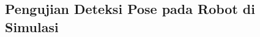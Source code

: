 \subsection{Pengujian Deteksi Pose pada Robot di Simulasi}
\label{subsec:deteksiposesimulasi}

\textcolor{red}{\lipsum[1-2]}

